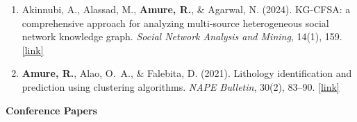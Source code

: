\documentclass[11pt, letterpaper]{article}
\newcommand{\pubentry}[1]{%
  \item #1
}
\begin{document}
\begin{enumerate}[leftmargin=1.5em, itemsep=5pt, topsep=4pt]
  \pubentry{%
    Akinnubi, A., Alassad, M., \textbf{Amure, R.}, \& Agarwal, N. (2024).
    KG-CFSA: a comprehensive approach for analyzing multi-source heterogeneous social network knowledge graph.
    \textit{Social Network Analysis and Mining}, 14(1), 159.
    \href{https://link.springer.com/article/10.1007/s13278-024-01320-y}{[link]}
  }

  \pubentry{%
    \textbf{Amure, R.}, Alao, O.~A., \& Falebita, D. (2021).
    Lithology identification and prediction using clustering algorithms.
    \textit{NAPE Bulletin}, 30(2), 83--90.
    \href{https://www.researchgate.net/publication/359617732}{[link]}
  }

\end{enumerate}

\vspace{8pt}
\textbf{Conference Papers}
\end{document}
